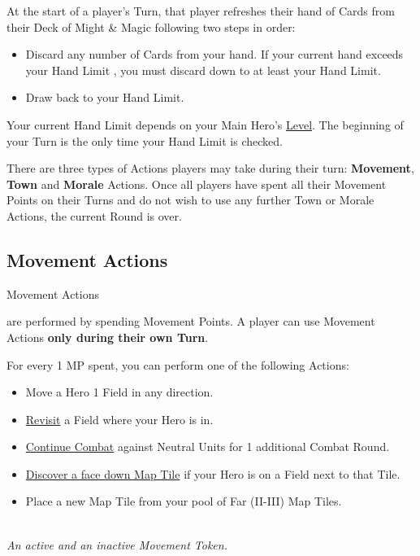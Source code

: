 
\begin{multicols*}{2}

At the start of a player's Turn, that player refreshes their hand of Cards from their Deck of Might \& Magic following two steps in order:
\begin{itemize}
  \item Discard any number of Cards from your hand.
If your current hand exceeds your Hand Limit , you must discard down to at least your Hand Limit.
  \item Draw back to your Hand Limit.
\end{itemize}
Your current Hand Limit depends on your Main Hero's \hyperlink{Level}{Level}.
The beginning of your Turn is the only time your Hand Limit is checked.\par
There are three types of Actions players may take during their turn: \textbf{Movement}, \textbf{Town} and \textbf{Morale} Actions.
Once all players have spent all their Movement Points on their Turns and do not wish to use any further Town or Morale Actions, the current Round is over.
\subsection*{Movement Actions}
\hypertarget{Movement}{Movement Actions} are performed by spending Movement Points.
A player can use Movement Actions \textbf{only during their own Turn}.\par
For every 1 MP spent, you can perform one of the following Actions:
\begin{itemize}
  \item Move a Hero 1 Field in any direction.
  \item \hyperlink{Categories}{Revisit} a Field where your Hero is in.
  \item \hyperlink{Timelimit}{Continue Combat} against Neutral Units for 1 additional Combat Round.
  \item \hyperlink{Placing}{Discover a face down Map Tile} if your Hero is on a Field next to that Tile.
  \item Place a new Map Tile from your pool of Far (II-III) Map Tiles.
\end{itemize}

\begin{center}
  \\
  \medskip
  \footnotesize\textit{An active and an inactive Movement Token.}
\end{center}


\end{multicols*}
